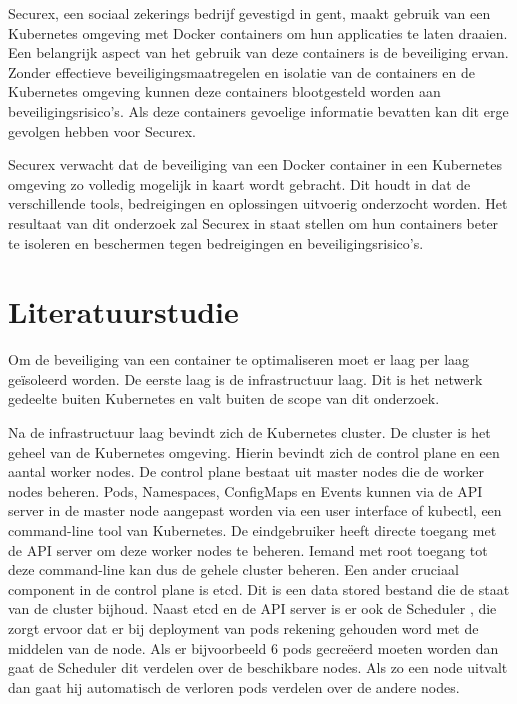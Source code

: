 Securex, een sociaal zekerings bedrijf gevestigd in gent, maakt gebruik van een Kubernetes omgeving met Docker containers om hun applicaties te laten draaien. Een belangrijk aspect van het gebruik van deze containers is de beveiliging ervan. Zonder effectieve beveiligingsmaatregelen en isolatie van de containers en de Kubernetes omgeving kunnen deze containers blootgesteld worden aan beveiligingsrisico's. Als deze containers gevoelige informatie bevatten kan dit erge gevolgen hebben voor Securex.

Securex verwacht dat de beveiliging van een Docker container in een Kubernetes omgeving zo volledig mogelijk in kaart wordt gebracht. Dit houdt in dat de verschillende tools, bedreigingen en oplossingen uitvoerig onderzocht worden. Het resultaat van dit onderzoek zal Securex in staat stellen om hun containers beter te isoleren en beschermen tegen bedreigingen en beveiligingsrisico's.



\section{Literatuurstudie}%
\label{sec:Literatuurstudie}

\autocite{Allclair-2018} Om de beveiliging van een container te optimaliseren moet er laag per laag geïsoleerd worden. De eerste laag is de infrastructuur laag. Dit is het netwerk gedeelte buiten Kubernetes en valt buiten de scope van dit onderzoek. 


Na de infrastructuur laag bevindt zich de Kubernetes cluster. De cluster is het geheel van de Kubernetes omgeving. Hierin bevindt zich de control plane en een aantal worker nodes. 
De control plane bestaat uit master nodes die de worker nodes beheren. 
\autocite{kubernetesDocs-2022} Pods, Namespaces, ConfigMaps en Events kunnen via de API server in de master node aangepast worden via een user interface of kubectl, een command-line tool van Kubernetes. De eindgebruiker heeft directe toegang met de API server om deze worker nodes te beheren. Iemand met root toegang tot deze command-line kan dus de gehele cluster beheren. \autocite{sayfan-2020} Een ander cruciaal component in de control plane is etcd. Dit is een data stored bestand die de staat van de cluster bijhoud. Naast etcd en de API server is er ook de Scheduler \autocite{Huss2019}, die zorgt ervoor dat er bij deployment van pods rekening gehouden word met de middelen van de node. Als er bijvoorbeeld 6 pods gecreëerd moeten worden dan gaat de Scheduler dit verdelen over de beschikbare nodes. Als zo een node uitvalt dan gaat hij automatisch de verloren pods verdelen over de andere nodes.


